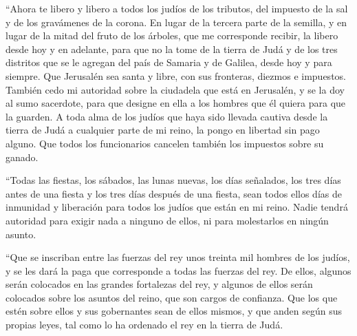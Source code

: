  ``Ahora te libero y libero a todos los judíos de los
tributos, del impuesto de la sal y de los gravámenes de la corona.
 En lugar de la tercera parte de la semilla, y en lugar
de la mitad del fruto de los árboles, que me corresponde recibir, la
libero desde hoy y en adelante, para que no la tome de la tierra de Judá
y de los tres distritos que se le agregan del país de Samaria y de
Galilea, desde hoy y para siempre.  Que Jerusalén sea
santa y libre, con sus fronteras, diezmos e impuestos. 
También cedo mi autoridad sobre la ciudadela que está en Jerusalén, y se
la doy al sumo sacerdote, para que designe en ella a los hombres que él
quiera para que la guarden.  A toda alma de los judíos
que haya sido llevada cautiva desde la tierra de Judá a cualquier parte
de mi reino, la pongo en libertad sin pago alguno. Que todos los
funcionarios cancelen también los impuestos sobre su ganado.

 ``Todas las fiestas, los sábados, las lunas nuevas, los
días señalados, los tres días antes de una fiesta y los tres días
después de una fiesta, sean todos ellos días de inmunidad y liberación
para todos los judíos que están en mi reino.  Nadie
tendrá autoridad para exigir nada a ninguno de ellos, ni para
molestarlos en ningún asunto.

 ``Que se inscriban entre las fuerzas del rey unos
treinta mil hombres de los judíos, y se les dará la paga que corresponde
a todas las fuerzas del rey.  De ellos, algunos serán
colocados en las grandes fortalezas del rey, y algunos de ellos serán
colocados sobre los asuntos del reino, que son cargos de confianza. Que
los que estén sobre ellos y sus gobernantes sean de ellos mismos, y que
anden según sus propias leyes, tal como lo ha ordenado el rey en la
tierra de Judá.

